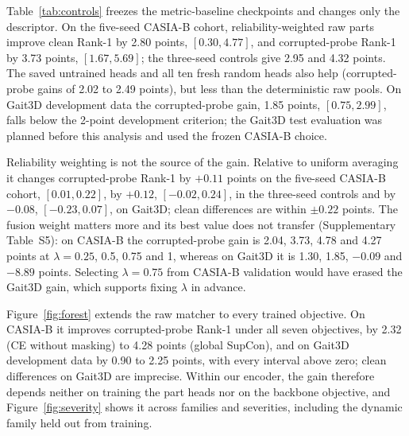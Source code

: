 \documentclass[review,12pt]{elsarticle}
\newcommand{\tablesetup}{\vspace{2pt}\footnotesize\renewcommand{\baselinestretch}{1.0}\selectfont\setlength{\tabcolsep}{3.5pt}}
\begin{document}
Table~\ref{tab:controls} freezes the metric-baseline checkpoints and changes only
the descriptor. On the five-seed CASIA-B cohort, reliability-weighted raw parts
improve clean Rank-1 by 2.80 points, $[0.30,4.77]$, and corrupted-probe Rank-1
by 3.73 points, $[1.67,5.69]$; the three-seed controls give 2.95 and 4.32
points. The saved untrained heads and all ten fresh random heads also help
(corrupted-probe gains of 2.02 to 2.49 points), but less than the deterministic
raw pools. On Gait3D development data the corrupted-probe gain, 1.85 points,
$[0.75,2.99]$, falls below the 2-point development criterion; the Gait3D test
evaluation was planned before this analysis and used the frozen CASIA-B
choice.

\begin{table}[!htbp]
\centering
\caption{Checkpoint-only descriptor controls on frozen metric-baseline
checkpoints at the declared fusion weight $\lambda=0.5$: (a) Rank-1 (\%) and
(b) paired differences (points) with crossed 95\% intervals. Controls
re-encode each checkpoint, so their global and raw-part values differ from
Table~\ref{tab:casia5} by at most 0.05 points.}
\label{tab:controls}
{\tablesetup\setlength{\tabcolsep}{2.2pt}
}
\end{table}

Reliability weighting is not the source of the gain. Relative to uniform
averaging it changes corrupted-probe Rank-1 by $+0.11$ points on the five-seed
CASIA-B cohort, $[0.01,0.22]$, by $+0.12$, $[-0.02,0.24]$, in the three-seed
controls and by $-0.08$, $[-0.23,0.07]$, on Gait3D; clean differences are
within $\pm0.22$ points. The fusion weight matters more and its best value does
not transfer (Supplementary Table~S5): on CASIA-B the corrupted-probe gain is
2.04, 3.73, 4.78 and 4.27 points at $\lambda=0.25$, 0.5, 0.75 and 1, whereas on
Gait3D it is 1.30, 1.85, $-0.09$ and $-8.89$ points. Selecting $\lambda=0.75$
from CASIA-B validation would have erased the Gait3D gain, which supports
fixing $\lambda$ in advance.

Figure~\ref{fig:forest} extends the raw matcher to every trained objective. On
CASIA-B it improves corrupted-probe Rank-1 under all seven objectives, by 2.32
(CE without masking) to 4.28 points (global SupCon), and on Gait3D development
data by 0.90 to 2.25 points, with every interval above zero; clean differences
on Gait3D are imprecise. Within our encoder, the gain therefore depends neither
on training the part heads nor on the backbone objective, and
Figure~\ref{fig:severity} shows it across families and severities, including
the dynamic family held out from training.
\end{document}
